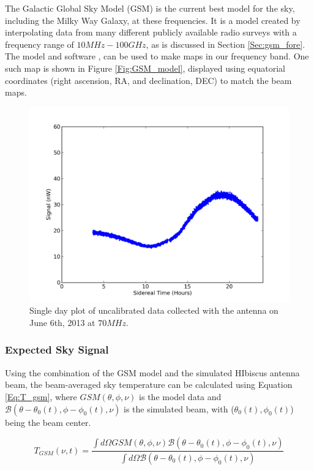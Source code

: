 The Galactic Global Sky Model (GSM) is the current best model for the sky, including the Milky Way Galaxy, at these frequencies. It is a model created by interpolating data from many different publicly available radio surveys with a frequency range of $10 MHz - 100 GHz$, as is discussed in Section \ref{Sec:gsm_fore}. The model and software \cite{GSM_model}, can be used to make maps in our frequency band. One such map is shown in Figure \ref{Fig:GSM_model}, displayed using equatorial coordinates (right ascension, RA, and declination, DEC) to match the beam maps. 

\begin{figure}[htb]
\begin{center}
\includegraphics[width=0.9\linewidth]{Data_analysis/figures/June_06_time_series_uncal_70mhz.png}
\caption{Single day plot of uncalibrated data collected with the antenna on June 6th, 2013 at $70 MHz$.}
\label{Fig:raw_time_series}
\end{center}
\end{figure}

\subsubsection{Expected Sky Signal}

Using the combination of the GSM model and the simulated HIbiscus antenna beam, the beam-averaged sky temperature can be calculated using Equation \ref{Eq:T_gsm}, where $GSM (\theta, \phi, \nu)$ is the model data and $\mathcal{B} (\theta - \theta_0(t), \phi - \phi_0(t),\nu)$ is the simulated beam, with ($\theta_0 (t),\phi_0 (t)$) being the beam center. 


\begin{equation} \label{Eq:T_gsm}
T_{GSM} (\nu,t) = \frac{ \int d \Omega GSM (\theta, \phi, \nu) \mathcal{B} (\theta - \theta_0(t), \phi - \phi_0(t),\nu)}{\int d\Omega \mathcal{B} (\theta -\theta_0(t), \phi - \phi_0(t), \nu)}
\end{equation}

